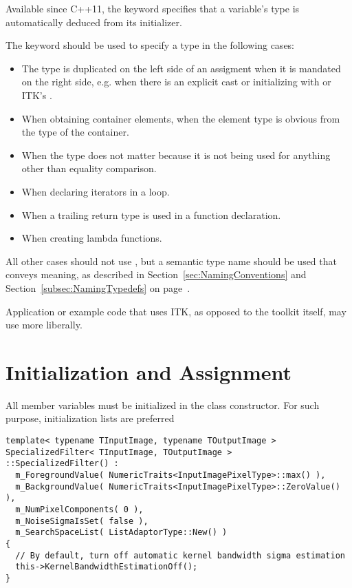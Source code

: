Available since C++11, the  keyword specifies that a variable's type
is automatically deduced from its initializer.

The  keyword should be used to specify a type in the following cases:

\begin{itemize}
\item The type is duplicated on the left side of an assigment when it is mandated on the
	right side, e.g. when there is an explicit cast or initializing with  or ITK's .
\item When obtaining container elements, when the element type is obvious from the type
      of the container.
\item When the type does not matter because it is not being used for anything other
      than equality comparison.
\item When declaring iterators in a  loop.
\item When a trailing return type is used in a function declaration.
\item When creating lambda functions.
\end{itemize}

All other cases should not use , but a semantic type name
should be used that conveys meaning, as described in Section~\ref{sec:NamingConventions}
and Section~\ref{subsec:NamingTypedefs} on page~\pageref{subsec:NamingTypedefs}.

Application or example code that uses ITK, as opposed to the toolkit itself,
may use  more liberally.


\section{Initialization and Assignment}
\label{sec:IniitalizationAndAssignment}

All member variables must be initialized in the class constructor. For such
purpose, initialization lists are preferred

\small
\begin{verbatim}
template< typename TInputImage, typename TOutputImage >
SpecializedFilter< TInputImage, TOutputImage >
::SpecializedFilter() :
  m_ForegroundValue( NumericTraits<InputImagePixelType>::max() ),
  m_BackgroundValue( NumericTraits<InputImagePixelType>::ZeroValue() ),
  m_NumPixelComponents( 0 ),
  m_NoiseSigmaIsSet( false ),
  m_SearchSpaceList( ListAdaptorType::New() )
{
  // By default, turn off automatic kernel bandwidth sigma estimation
  this->KernelBandwidthEstimationOff();
}
\end{verbatim}
\normalsize

